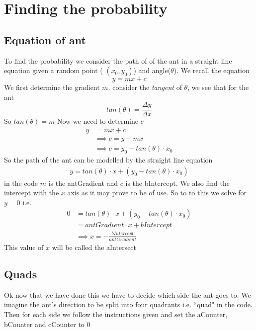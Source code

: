 \documentclass[11pt]{article}
\begin{document}
\section{Finding the probability}
\subsection{Equation of ant}
To find the probability we consider the path of of the ant in a straight line equation given a random point ( $(x_{0},y_{0})$) and angle($\theta$). We recall the equation
\begin{equation*}
  y = mx + c
\end{equation*}
We first determine the gradient $m$. consider the \emph{tangent} of $\theta$, we see that for the ant
\begin{equation*}
  tan(\theta) = \frac{\Delta y}{\Delta x}
\end{equation*}
So $tan(\theta) = m$ Now we need to determine $c$
\begin{align*}
  y &= mx+c \\
   &\implies c = y - mx \\
   &\implies c = y_{0} - tan(\theta) \cdot x_{0}
\end{align*}
So the path of the ant can be modelled by the straight line equation
\begin{align*}
  y = tan(\theta) \cdot x + (y_{0} - tan(\theta) \cdot x_{0})
\end{align*}
in the code $m$ is the antGradient and $c$ is the bIntercept. We also find the intercept with the $x$ axis as it may prove to be of use. So to to this we solve for $y=0$ i.e.
\begin{align*}
  0 &= tan(\theta) \cdot x + (y_{0} - tan(\theta) \cdot x_{0}) \\
    &= antGradient \cdot x + bIntercept \\
    &\implies x = -\frac{bIntercept}{antGradient}
\end{align*}
This value of $x$ will be called the aIntersect

\subsection{Quads}
Ok now that we have done this we have to decide which side the ant goes to. We imagine the ant's direction to be split into four quadrants i.e. ``quad" in the code. Then for each side we follow the instructions given and set the aCounter, bCounter and cCounter to $0$
\end{document}
